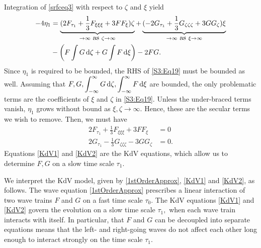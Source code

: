 Integration of \eqref{srfceq3} with respect to $\zeta$ and $\xi$ yield
\begin{equation}\label{S3:Eq19}
\begin{aligned}
- 4\eta_{1} &= \underbrace{(2F_{\tau_1} + \frac{1}{3}F_{\xi\xi\xi} + 3 F F_\xi) \zeta}_{\to \infty \mbox{ as } \zeta \to \infty} + \underbrace{(- 2G_{\tau_1} +  \frac{1}{3}G_{\zeta\zeta\zeta}+ 3 G G_\zeta) \xi}_{\to \infty \mbox{ as } \xi \to \infty} \\
&- \left(F \int G \,\mathrm{d} \zeta  + G \int F \,\mathrm{d} \xi \right)- 2 FG.
\end{aligned}
\end{equation}
Since $\eta_1$ is required to be bounded, the RHS of \eqref{S3:Eq19} must be bounded as well. Assuming that $F, G, \displaystyle\int^{\infty}_{-\infty} G \,\mathrm{d} \zeta, \int^{\infty}_{-\infty} F \,\mathrm{d} \xi$ are bounded, the only problematic terms are the coefficients of $\xi$ and $\zeta$ in \eqref{S3:Eq19}. Unless the under-braced terms vanish, $\eta_1$ grows without bound as $\xi, \zeta \to \infty.$ Hence, these are the secular terms we wish to remove. Then, we must have 
\begin{align}
2F_{\tau_1} + \frac{1}{3}F_{\xi\xi\xi} + 3 F F_\xi &= 0 \label{KdV1} \\
2G_{\tau_1} - \frac{1}{3}G_{\zeta\zeta\zeta} -  3 G G_\zeta &= 0. \label{KdV2}
\end{align}
Equations \eqref{KdV1} and \eqref{KdV2} are the KdV equations, which allow us to determine $F, G$ on a slow time scale $\tau_1.$ 

We interpret the KdV model, given by \eqref{1stOrderApprox}, \eqref{KdV1} and \eqref{KdV2}, as follows. The wave equation \eqref{1stOrderApprox} prescribes a linear interaction of two wave trains $F$ and $G$ on a fast time scale $\tau_0.$ The KdV equations \eqref{KdV1} and \eqref{KdV2} govern the evolution on a slow time scale $\tau_1,$ when each wave train interacts with itself. In particular, that $F$ and $G$ can be decoupled into separate equations means that the left- and right-going waves do not affect each other long enough to interact strongly on the time scale $\tau_1$. 

